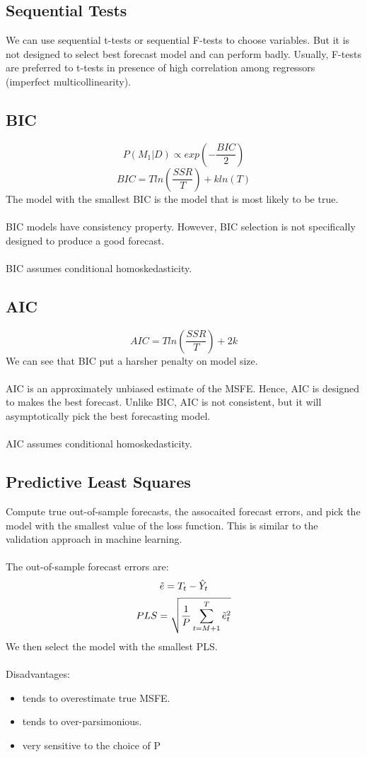 \documentclass{article}
\begin{document}
\subsection{Sequential Tests}
We can use sequential t-tests or sequential F-tests to choose variables. But it is not designed to select best forecast model and can perform badly. Usually, F-tests are preferred to t-tests in presence of high correlation among regressors (imperfect multicollinearity).

\subsection{BIC}
$$P(M_1|D) \propto exp(-\frac{BIC}{2})$$
$$BIC = Tln(\frac{SSR}{T}) + kln(T)$$
The model with the smallest BIC is the model that is most likely to be true.\\
\\
BIC models have consistency property. However, BIC selection is not specifically designed to produce a good forecast.\\
\\
BIC assumes conditional homoskedasticity.

\subsection{AIC}
$$AIC = Tln(\frac{SSR}{T}) + 2k$$
We can see that BIC put a harsher penalty on model size.\\
\\
AIC is an approximately unbiased estimate of the MSFE. Hence, AIC is designed to makes the best forecast. Unlike BIC, AIC is not consistent, but it will asymptotically pick the best forecasting model.\\
\\
AIC assumes conditional homoskedasticity.

\subsection{Predictive Least Squares}
Compute true out-of-sample forecasts, the assocaited forecast errors, and pick the model with the smallest value of the loss function. This is similar to the validation approach in machine learning.\\
\\
The out-of-sample forecast errors are:
$$\Tilde{e} = T_t - \hat{Y}_t$$
$$PLS = \sqrt{\frac{1}{P}\sum_{t=M+1}^T \Tilde{e}_t^2}$$
We then select the model with the smallest PLS.\\
\\
Disadvantages:
\begin{itemize}
    \item tends to overestimate true MSFE.
    \item tends to over-parsimonious.
    \item very sensitive to the choice of P
\end{itemize}
\end{document}
